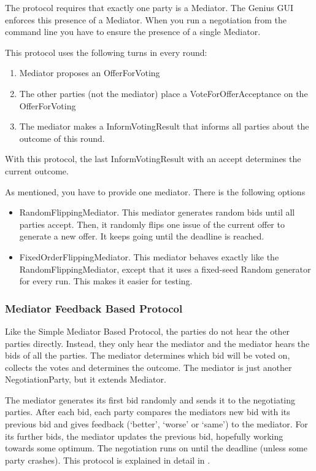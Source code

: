 \documentclass[]{llncs}
\newcommand*\vtick{\textsc{\char13}}
\newcommand\Genius{{\sc Genius}}
\begin{document}
The protocol requires that exactly one party is a Mediator. The {\Genius} GUI enforces this presence of a Mediator. When you run a negotiation from the command line you have to ensure the presence of a single Mediator.

This protocol uses the following turns in every round:
\begin{enumerate}
\item Mediator proposes an OfferForVoting
\item The other parties (not the mediator) place a VoteForOfferAcceptance on the OfferForVoting
\item The mediator makes a InformVotingResult that informs all parties about the outcome of this round.
\end{enumerate}

With this protocol, the last InformVotingResult with an accept determines the current outcome. 

As mentioned, you have to provide one mediator. There is the following options 
\begin{itemize}
\item RandomFlippingMediator.   This mediator generates random bids until all parties accept. Then, it
  randomly flips one issue of the current offer to generate a new offer. It
  keeps going until the deadline is reached. 
 \item FixedOrderFlippingMediator.   This mediator behaves exactly like the RandomFlippingMediator, except that it uses a fixed-seed Random generator for every run. This makes it easier for testing. 

\end{itemize}

\subsubsection{Mediator  Feedback Based Protocol}
Like the Simple Mediator Based Protocol, the parties do not hear the other parties directly. Instead, they only hear the mediator and the mediator hears the bids of all the parties. The mediator determines which bid will be voted on, collects the votes and determines the outcome. The mediator is just another NegotiationParty, but it extends Mediator.

 The mediator generates its first bid randomly and sends it to the negotiating parties. After each bid, each party compares the mediator\vtick s new bid with its previous bid and gives feedback (`better', `worse' or `same')  to the mediator. For its further bids, the mediator updates the previous bid, hopefully working towards some optimum. The negotiation runs on until the deadline (unless some party crashes). This protocol is explained in detail in \cite{MultiMediatedNegoProtocolsWithFeedback}.
\end{document}
